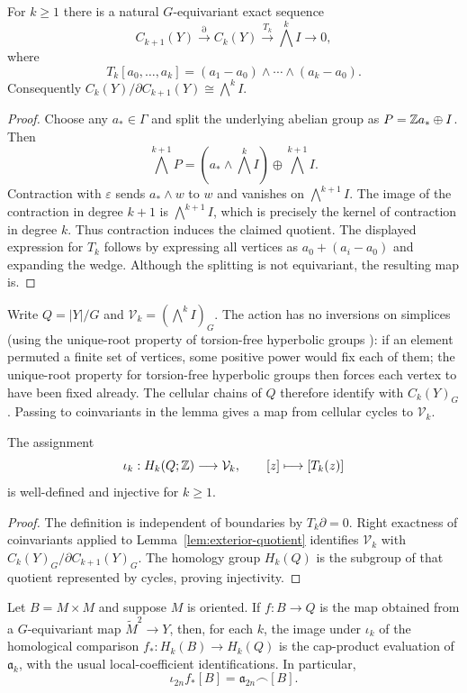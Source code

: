 \begin{lemma}\label{lem:exterior-quotient}
For $k\geq1$ there is a natural $G$-equivariant exact sequence
\[
 C_{k+1}(Y)\xrightarrow{\partial}C_k(Y)
 \xrightarrow{T_k}\bigwedge^kI\longrightarrow0,
\]
where
\[
 T_k[a_0,\ldots,a_k]
 =(a_1-a_0)\wedge\cdots\wedge(a_k-a_0).
\]
Consequently
$C_k(Y)/\partial C_{k+1}(Y)\cong\bigwedge^kI$.
\end{lemma}

\begin{proof}
Choose any $a_*\in\Gamma$ and split the underlying abelian
group as $P=\mathbb{Z} a_*\oplus I$. Then
\[
 \bigwedge^{k+1}P
 = (a_*\wedge\bigwedge^kI)\oplus\bigwedge^{k+1}I.
\]
Contraction with $\varepsilon$ sends $a_*\wedge w$ to $w$
and vanishes on $\bigwedge^{k+1}I$.
The image of the contraction in degree $k+1$ is
$\bigwedge^{k+1}I$, which is precisely the kernel of
contraction in degree $k$. Thus contraction induces the
claimed quotient. The displayed expression for $T_k$
follows by expressing all vertices as
$a_0+(a_i-a_0)$ and expanding the wedge.
Although the splitting is not equivariant, the resulting map is.
\end{proof}

Write $Q=|Y|/G$ and
$\mathcal V_k=(\bigwedge^k I)_G$.
The action has no inversions on simplices (using the unique-root
property of torsion-free hyperbolic groups
\cite{BridsonHaefliger1999}): if an element
permuted a finite set of vertices, some positive power would
fix each of them; the unique-root property for torsion-free
hyperbolic groups then forces each vertex to have been fixed
already. The cellular chains of $Q$ therefore identify with
$C_k(Y)_G$. Passing to coinvariants in the lemma gives a
map from cellular cycles to $\mathcal V_k$.

\begin{lemma}\label{lem:cycle-injective}
The assignment
\[
 \iota_k:H_k(Q;\mathbb{Z})\longrightarrow\mathcal V_k,\qquad
 [z]\longmapsto[T_k(z)]
\]
is well-defined and injective for $k\geq1$.
\end{lemma}

\begin{proof}
The definition is independent of boundaries by
$T_k\partial=0$. Right exactness of coinvariants applied to
Lemma~\ref{lem:exterior-quotient} identifies
$\mathcal V_k$ with
$C_k(Y)_G/\partial C_{k+1}(Y)_G$.
The homology group $H_k(Q)$ is the subgroup of that
quotient represented by cycles, proving injectivity.
\end{proof}

\begin{proposition}\label{prop:comparison}
Let $B=M\times M$ and suppose $M$ is oriented.
If $f:B\to Q$ is the map obtained from a $G$-equivariant
map $\widetilde M^2\to Y$, then, for each $k$,
the image under $\iota_k$ of the homological comparison
$f_*:H_k(B)\to H_k(Q)$ is the cap-product evaluation
of $\mathfrak a_k$, with the usual local-coefficient
identifications. In particular,
\begin{equation}\label{eq:A-comparison}
 \iota_{2n}f_*[B]
 =\mathfrak a_{2n}\frown[B].
\end{equation}
\end{proposition}

